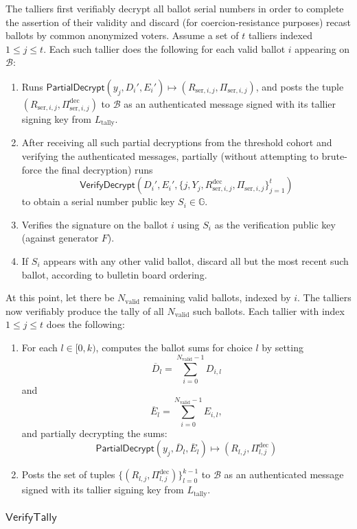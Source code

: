 \documentclass{article}
\newcommand{\G}{\mathbb{G}}
\newcommand{\func}[1]{\mathsf{#1}}
\begin{document}
The talliers first verifiably decrypt all ballot serial numbers in order to complete the assertion of their validity and discard (for coercion-resistance purposes) recast ballots by common anonymized voters.
Assume a set of $t$ talliers indexed $1 \leq j \leq t$.
Each such tallier does the following for each valid ballot $i$ appearing on $\mathcal{B}$:
\begin{enumerate}
    \item Runs $\func{PartialDecrypt}(y_j, D_i', E_i') \mapsto (R_{\text{ser},i,j}, \Pi_{\text{ser},i,j})$, and posts the tuple $(R_{\text{ser},i,j}, \Pi_{\text{ser},i,j}^{\text{dec}})$ to $\mathcal{B}$ as an authenticated message signed with its tallier signing key from $L_{\text{tally}}$.
    \item After receiving all such partial decryptions from the threshold cohort and verifying the authenticated messages, partially (without attempting to brute-force the final decryption) runs $$\func{VerifyDecrypt}(D_i', E_i', \{j, Y_j, R_{\text{ser},i,j}^{\text{dec}}, \Pi_{\text{ser},i,j}\}_{j=1}^t)$$ to obtain a serial number public key $S_i \in \G$.
    \item Verifies the signature on the ballot $i$ using $S_i$ as the verification public key (against generator $F$).
    \item If $S_i$ appears with any other valid ballot, discard all but the most recent such ballot, according to bulletin board ordering.
\end{enumerate}

At this point, let there be $N_{\text{valid}}$ remaining valid ballots, indexed by $i$.
The talliers now verifiably produce the tally of all $N_{\text{valid}}$ such ballots.
Each tallier with index $1 \leq j \leq t$ does the following:
\begin{enumerate}
    \item For each $l \in [0,k)$, computes the ballot sums for choice $l$ by setting $$\overline{D}_l = \sum_{i=0}^{N_{\text{valid}}-1} D_{i,l}$$ and $$\overline{E}_l = \sum_{i=0}^{N_{\text{valid}}-1} E_{i,l},$$ and partially decrypting the sums:
    $$\func{PartialDecrypt}(y_j, \overline{D}_l, \overline{E}_l) \mapsto (R_{l,j},\Pi_{l,j}^{\text{dec}})$$
    \item Posts the set of tuples $\{(R_{l,j},\Pi_{l,j}^{\text{dec}})\}_{l=0}^{k-1}$ to $\mathcal{B}$ as an authenticated message signed with its tallier signing key from $L_{\text{tally}}$.
\end{enumerate}


\subsubsection{\texorpdfstring{$\func{VerifyTally}$}{VerifyTally}}
\end{document}
